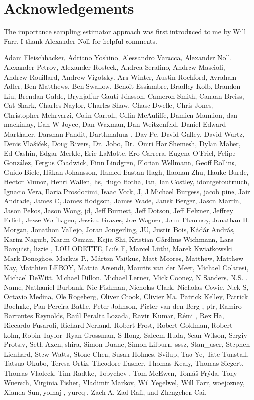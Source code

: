 \documentclass[
  letterpaper,
  DIV=11,
  numbers=noendperiod]{scrartcl}
\begin{document}
\section*{Acknowledgements}\label{acknowledgements}

The importance sampling estimator approach was first introduced to me by
Will Farr. I thank Alexander Noll for helpful comments.

Adam Fleischhacker, Adriano Yoshino, Alessandro Varacca, Alexander Noll,
Alexander Petrov, Alexander Rosteck, Andrea Serafino, Andrew Mascioli,
Andrew Rouillard, Andrew Vigotsky, Ara Winter, Austin Rochford, Avraham
Adler, Ben Matthews, Ben Swallow, Benoit Essiambre, Bradley Kolb,
Brandon Liu, Brendan Galdo, Brynjolfur Gauti Jónsson, Cameron Smith,
Canaan Breiss, Cat Shark, Charles Naylor, Charles Shaw, Chase Dwelle,
Chris Jones, Christopher Mehrvarzi, Colin Carroll, Colin McAuliffe,
Damien Mannion, dan mackinlay, Dan W Joyce, Dan Waxman, Dan Weitzenfeld,
Daniel Edward Marthaler, Darshan Pandit, Darthmaluus , Dav Pe, David
Galley, David Wurtz, Denis Vlašiček, Doug Rivers, Dr.~Jobo, Dr.~Omri Har
Shemesh, Dylan Maher, Ed Cashin, Edgar Merkle, Eric LaMotte, Ero
Carrera, Eugene O'Friel, Felipe González, Fergus Chadwick, Finn
Lindgren, Florian Wellmann, Geoff Rollins, Guido Biele, Håkan Johansson,
Hamed Bastan-Hagh, Haonan Zhu, Hauke Burde, Hector Munoz, Henri Wallen,
hs, Hugo Botha, Ian, Ian Costley, idontgetoutmuch, Ignacio Vera, Ilaria
Prosdocimi, Isaac Vock, J, J Michael Burgess, jacob pine, Jair Andrade,
James C, James Hodgson, James Wade, Janek Berger, Jason Martin, Jason
Pekos, Jason Wong, jd, Jeff Burnett, Jeff Dotson, Jeff Helzner, Jeffrey
Erlich, Jesse Wolfhagen, Jessica Graves, Joe Wagner, John Flournoy,
Jonathan H. Morgan, Jonathon Vallejo, Joran Jongerling, JU, Justin Bois,
Kádár András, Karim Naguib, Karim Osman, Kejia Shi, Kristian Gårdhus
Wichmann, Lars Barquist, lizzie , LOU ODETTE, Luís F, Marcel Lüthi,
Marek Kwiatkowski, Mark Donoghoe, Markus P., Márton Vaitkus, Matt
Moores, Matthew, Matthew Kay, Matthieu LEROY, Mattia Arsendi, Maurits
van der Meer, Michael Colaresi, Michael DeWitt, Michael Dillon, Michael
Lerner, Mick Cooney, N Sanders, N.S. , Name, Nathaniel Burbank, Nic
Fishman, Nicholas Clark, Nicholas Cowie, Nick S, Octavio Medina, Ole
Rogeberg, Oliver Crook, Olivier Ma, Patrick Kelley, Patrick Boehnke, Pau
Pereira Batlle, Peter Johnson, Pieter van den Berg , ptr, Ramiro
Barrantes Reynolds, Raúl Peralta Lozada, Ravin Kumar, Rémi , Rex Ha,
Riccardo Fusaroli, Richard Nerland, Robert Frost, Robert Goldman, Robert
kohn, Robin Taylor, Ryan Grossman, S Hong, Saleem Huda, Sean Wilson,
Sergiy Protsiv, Seth Axen, shira, Simon Duane, Simon Lilburn, sssz,
Stan\_user, Stephen Lienhard, Stew Watts, Stone Chen, Susan Holmes,
Svilup, Tao Ye, Tate Tunstall, Tatsuo Okubo, Teresa Ortiz, Theodore
Dasher, Thomas Kealy, Thomas Siegert, Thomas Vladeck, Tim Radtke,
Tobychev , Tom McEwen, Tomáš Frýda, Tony Wuersch, Virginia Fisher,
Vladimir Markov, Wil Yegelwel, Will Farr, woejozney, Xianda Sun, yolhaj
, yureq , Zach A, Zad Rafi, and Zhengchen Cai.
\end{document}
